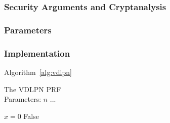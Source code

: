 \subsubsection*{Security Arguments and Cryptanalysis}


\subsubsection*{Parameters}


\subsubsection*{Implementation}

Algorithm~\ref{alg:vdlpn}

\begin{algorithm}
  \caption{\label{alg:vdlpn}The VDLPN PRF \\
    Parameters: $n$ ...}
  \begin{algorithmic}
    \State $x = 0$
    \Return False
  \end{algorithmic}
\end{algorithm}




